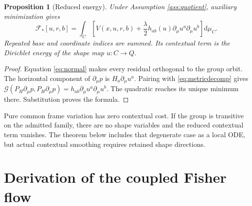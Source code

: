 \documentclass[11pt]{article}
\newtheorem{proposition}[theorem]{Proposition}
\newcommand{\G}{\mathcal G}
\newcommand{\dd}{\mathrm d}
\begin{document}
\begin{proposition}[Reduced energy]
Under Assumption \ref{ass:quotient}, auxiliary minimization gives
\begin{equation}
 \boxed{\mathcal F_*[u,r,b]=\int_C
 \left[V(x,u,r,b)+\frac\lambda2h_{ab}(u)
                   \partial_\mu u^a\partial_\mu u^b\right]\dd\mu_C.}
 \label{eq:reduced}
\end{equation}
Repeated base and coordinate indices are summed. Its contextual term is the Dirichlet energy of the shape map $u:C\to Q$.
\end{proposition}
\begin{proof}
Equation \eqref{eq:normal} makes every residual orthogonal to the group orbit. The horizontal component of $\partial_\mu p$ is $H_a\partial_\mu u^a$. Pairing with \eqref{eq:metricdecomp} gives
$\G(P_H\partial_\mu p,P_H\partial_\mu p)
=h_{ab}\partial_\mu u^a\partial_\mu u^b$.
The quadratic reaches its unique minimum there. Substitution proves the formula.
\end{proof}

Pure common frame variation has zero contextual cost. If the group is transitive on the admitted family, there are no shape variables and the reduced contextual term vanishes. The theorem below includes that degenerate case as a local ODE, but actual contextual smoothing requires retained shape directions.

\section{Derivation of the coupled Fisher flow}
\end{document}
